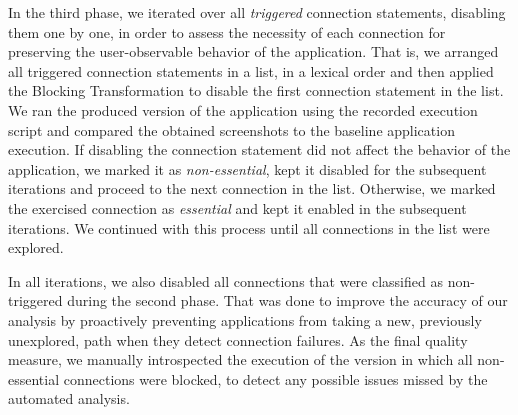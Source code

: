 In the third phase, we iterated over all \emph{triggered} connection statements, disabling them one by one, in order to assess
the necessity of each connection for preserving the user-observable behavior of the application. 
That is, we arranged all triggered connection statements in a list, in a lexical order and then applied the Blocking Transformation to disable the first connection statement in the list.   
We ran the produced version of the application using the recorded execution script and compared the obtained screenshots to the baseline application execution. If disabling the connection statement did not affect the behavior of the application, we marked it as \emph{non-essential}, kept it disabled for the subsequent iterations and proceed to the next connection in the list.
Otherwise, we marked the exercised connection as \emph{essential} and kept it enabled in the subsequent iterations.
We continued with this process until all connections in the list were explored.

In all iterations, we also disabled all connections that were classified as non-triggered during the second phase. 
That was done to improve the accuracy 
of our analysis by proactively preventing applications from taking a new, previously unexplored, path when they detect connection failures. 
As the final quality measure, we manually introspected the execution of the version in which all non-essential connections
were blocked, to detect any  possible issues missed by the automated analysis.

